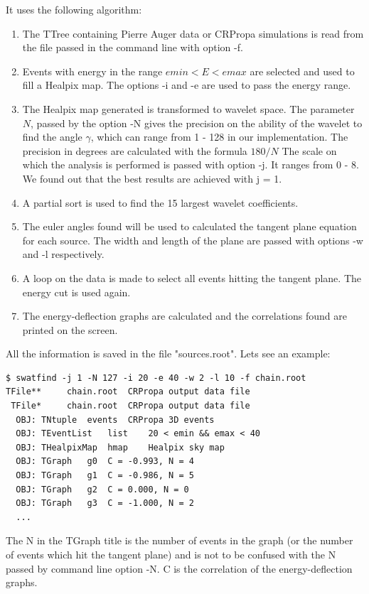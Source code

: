 \documentclass[12pt]{article}
\begin{document}
It uses the following algorithm:
\begin{enumerate}
\item The TTree containing Pierre Auger data or CRPropa simulations
is read from the file passed in the command line with option -f.
\item Events with energy in the range $emin < E < emax$ are selected and used
to fill a Healpix map.  The options -i and -e are used to pass the energy range.
\item The Healpix map generated is transformed to wavelet space. The parameter
$N$, passed by the option -N gives the precision on the ability of the wavelet
to find the angle $\gamma$, which can range from 1 - 128 in our implementation. 
The precision in degrees are calculated with the formula $180/N$ The scale on
which the analysis is performed is passed with option -j. It ranges from 0 - 8.
We found out that the best results are achieved with j = 1.
\item A partial sort is used to find the 15 largest wavelet coefficients.
\item The euler angles found will be used to calculated the tangent plane
equation for each source. The width and length of the plane are passed with
options -w and -l respectively.
\item A loop on the data is made to select all events hitting the tangent
plane. The energy cut is used again.
\item The energy-deflection graphs are calculated and the correlations found
are printed on the screen.
\end{enumerate}
All the information is saved in the file {\color{textcolor}"sources.root"}.  Lets see an example:

{\bf \color{textcolor}
\begin{lstlisting}
$ swatfind -j 1 -N 127 -i 20 -e 40 -w 2 -l 10 -f chain.root
TFile**		chain.root	CRPropa output data file
 TFile*		chain.root	CRPropa output data file
  OBJ: TNtuple	events	CRPropa 3D events
  OBJ: TEventList	list	20 < emin && emax < 40 
  OBJ: THealpixMap	hmap	Healpix sky map
  OBJ: TGraph	g0	C = -0.993, N = 4 
  OBJ: TGraph	g1	C = -0.986, N = 5
  OBJ: TGraph	g2	C = 0.000, N = 0
  OBJ: TGraph	g3	C = -1.000, N = 2
  ...
\end{lstlisting}
}

The N in the TGraph title is the number of events in the graph (or the number of 
events which hit the tangent plane) and is not to be confused with the N passed by command line
option -N. C is the correlation of the energy-deflection graphs.
\end{document}
